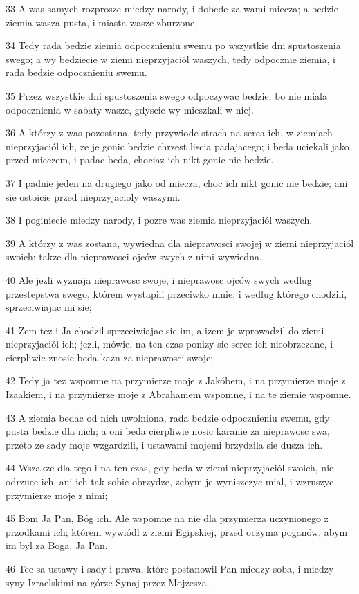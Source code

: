 \par 33 A was samych rozprosze miedzy narody, i dobede za wami miecza; a bedzie ziemia wasza pusta, i miasta wasze zburzone.
\par 34 Tedy rada bedzie ziemia odpocznieniu swemu po wszystkie dni spustoszenia swego; a wy bedziecie w ziemi nieprzyjaciól waszych, tedy odpocznie ziemia, i rada bedzie odpocznieniu swemu.
\par 35 Przez wszystkie dni spustoszenia swego odpoczywac bedzie; bo nie miala odpocznienia w sabaty wasze, gdyscie wy mieszkali w niej.
\par 36 A którzy z was pozostana, tedy przywiode strach na serca ich, w ziemiach nieprzyjaciól ich, ze je gonic bedzie chrzest liscia padajacego; i beda uciekali jako przed mieczem, i padac beda, chociaz ich nikt gonic nie bedzie.
\par 37 I padnie jeden na drugiego jako od miecza, choc ich nikt gonic nie bedzie; ani sie ostoicie przed nieprzyjacioly waszymi.
\par 38 I poginiecie miedzy narody, i pozre was ziemia nieprzyjaciól waszych.
\par 39 A którzy z was zostana, wywiedna dla nieprawosci swojej w ziemi nieprzyjaciól swoich; takze dla nieprawosci ojców swych z nimi wywiedna.
\par 40 Ale jezli wyznaja nieprawosc swoje, i nieprawosc ojców swych wedlug przestepstwa swego, którem wystapili przeciwko mnie, i wedlug którego chodzili, sprzeciwiajac mi sie;
\par 41 Zem tez i Ja chodzil sprzeciwiajac sie im, a izem je wprowadzil do ziemi nieprzyjaciól ich; jezli, mówie, na ten czas ponizy sie serce ich nieobrzezane, i cierpliwie znosic beda kazn za nieprawosci swoje:
\par 42 Tedy ja tez wspomne na przymierze moje z Jakóbem, i na przymierze moje z Izaakiem, i na przymierze moje z Abrahamem wspomne, i na te ziemie wspomne.
\par 43 A ziemia bedac od nich uwolniona, rada bedzie odpocznieniu swemu, gdy pusta bedzie dla nich; a oni beda cierpliwie nosic karanie za nieprawosc swa, przeto ze sady moje wzgardzili, i ustawami mojemi brzydzila sie dusza ich.
\par 44 Wszakze dla tego i na ten czas, gdy beda w ziemi nieprzyjaciól swoich, nie odrzuce ich, ani ich tak sobie obrzydze, zebym je wyniszczyc mial, i wzruszyc przymierze moje z nimi;
\par 45 Bom Ja Pan, Bóg ich. Ale wspomne na nie dla przymierza uczynionego z przodkami ich; którem wywiódl z ziemi Egipskiej, przed oczyma poganów, abym im byl za Boga, Ja Pan.
\par 46 Tec sa ustawy i sady i prawa, które postanowil Pan miedzy soba, i miedzy syny Izraelskimi na górze Synaj przez Mojzesza.

